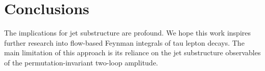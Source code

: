 \section{Conclusions}\label{sec:conclusions}

The implications for jet substructure are profound. We hope this work
inspires further research into flow-based Feynman integrals of tau
lepton decays. The main limitation of this approach is its reliance on
the jet substructure observables of the permutation-invariant two-loop
amplitude.

